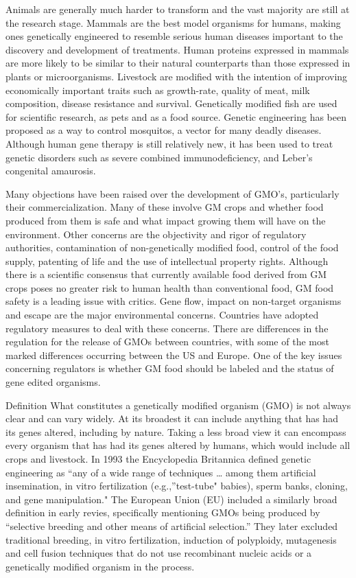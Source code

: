Animals are generally much harder to transform and the vast majority are still at the research stage. Mammals are the best model organisms for humans, making ones genetically engineered to resemble serious human diseases important to the discovery and development of treatments. Human proteins expressed in mammals are more likely to be similar to their natural counterparts than those expressed in plants or microorganisms. Livestock are modified with the intention of improving economically important traits such as growth-rate, quality of meat, milk composition, disease resistance and survival. Genetically modified fish are used for scientific research, as pets and as a food source. Genetic engineering has been proposed as a way to control mosquitos, a vector for many deadly diseases. Although human gene therapy is still relatively new, it has been used to treat genetic disorders such as severe combined immunodeficiency, and Leber's congenital amaurosis.

Many objections have been raised over the development of GMO's, particularly their commercialization. Many of these involve GM crops and whether food produced from them is safe and what impact growing them will have on the environment. Other concerns are the objectivity and rigor of regulatory authorities, contamination of non-genetically modified food, control of the food supply, patenting of life and the use of intellectual property rights. Although there is a scientific consensus that currently available food derived from GM crops poses no greater risk to human health than conventional food, GM food safety is a leading issue with critics. Gene flow, impact on non-target organisms and escape are the major environmental concerns. Countries have adopted regulatory measures to deal with these concerns. There are differences in the regulation for the release of GMOs between countries, with some of the most marked differences occurring between the US and Europe. One of the key issues concerning regulators is whether GM food should be labeled and the status of gene edited organisms.

Definition
What constitutes a genetically modified organism (GMO) is not always clear and can vary widely. At its broadest it can include anything that has had its genes altered, including by nature. Taking a less broad view it can encompass every organism that has had its genes altered by humans, which would include all crops and livestock. In 1993 the Encyclopedia Britannica defined genetic engineering as ``any of a wide range of techniques \ldots{} among them artificial insemination, in vitro fertilization (e.g.,''test-tube" babies), sperm banks, cloning, and gene manipulation." The European Union (EU) included a similarly broad definition in early revies, specifically mentioning GMOs being produced by ``selective breeding and other means of artificial selection.'' They later excluded traditional breeding, in vitro fertilization, induction of polyploidy, mutagenesis and cell fusion techniques that do not use recombinant nucleic acids or a genetically modified organism in the process.


